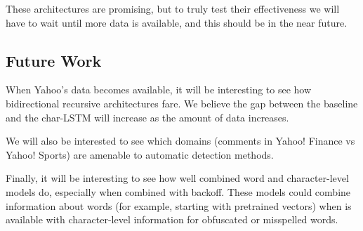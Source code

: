 \documentclass{article} %
\begin{document}
These architectures are promising, but to truly test their effectiveness we will have to wait until more data is available, and this should be in the near future. 


\subsection*{Future Work}
When Yahoo's data becomes available, it will be interesting to see how bidirectional recursive architectures fare. We believe the gap between the baseline and the char-LSTM will increase as the amount of data increases.

We will also be interested to see which domains (comments in Yahoo! Finance vs Yahoo! Sports) are amenable to automatic detection methods. 

Finally, it will be interesting to see how well combined word and character-level models do, especially when combined with backoff. These models could combine information about words (for example, starting with pretrained vectors) when is available with character-level information for obfuscated or misspelled words. 

\newpage
\nocite{*}


\end{document}
